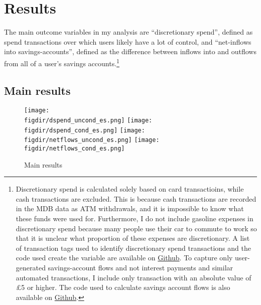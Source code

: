 
\section{Results}%
\label{sec:results}

The main outcome variables in my analysis are ``discretionary spend'', defined
as spend transactions over which users likely have a lot of control, and
``net-inflows into savings-accounts'', defined as the difference between
inflows into and outflows from all of a user's savings
accounts.\footnote{Discretionary spend is calculated solely based on card
    transactioins, while cash transactions are excluded. This is because cash
    transactions are recorded in the MDB data as ATM withdrawals, and it is
    impossible to know what these funds were used for. Furthermore, I do
    not include gasoline expenses in discretionary spend because many people
    use their car to commute to work so that it is unclear what proportion of
    these expenses are discretionary. A list of transaction tags used to
    identify discretionary spend transactions and the code used create the
    variable are available on
    \href{https://github.com/fabiangunzinger/mdb_eval/blob/f31bfcd7a330188cdd27968d41957ebf5b454099/src/data/aggregators.py\#L389}{Github}.
    To capture only user-generated savings-account flows and not interest
    payments and similar automated transactions, I include only transaction
with an absolute value of \pounds5 or higher. The code used to calculate
savings account flows is also available on
\href{https://github.com/fabiangunzinger/mdb_eval/blobf31bfcd7a330188cdd27968d41957ebf5b454099/src/data/aggregators.py\#L89}{Github}.}


\subsection{Main results}%
\label{sub:main_results}

\begin{figure}[h]
    \centering 
    \caption{Main results}
    \label{fig:main_results}
    \texttt{[image: \\figdir/dspend\_uncond\_es.png]}
    \texttt{[image: \\figdir/dspend\_cond\_es.png]}
    \texttt{[image: \\figdir/netflows\_uncond\_es.png]}
    \texttt{[image: \\figdir/netflows\_cond\_es.png]}
\end{figure}

